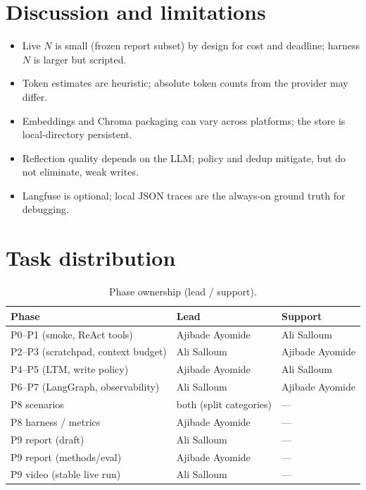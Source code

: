 \documentclass[11pt,a4paper]{article}
\begin{document}
\section{Discussion and limitations}

\begin{itemize}[leftmargin=*]
  \item Live \(N\) is small (frozen report subset) by design for cost and deadline; harness \(N\) is larger but scripted.
  \item Token estimates are heuristic; absolute token counts from the provider may differ.
  \item Embeddings and Chroma packaging can vary across platforms; the store is local-directory persistent.
  \item Reflection quality depends on the LLM; policy and dedup mitigate, but do not eliminate, weak writes.
  \item Langfuse is optional; local JSON traces are the always-on ground truth for debugging.
\end{itemize}

\section{Task distribution}

\begin{table}[ht]
\centering
\caption{Phase ownership (lead / support).}
\label{tab:owners}
\small
\begin{tabularx}{\textwidth}{@{}>{\raggedright\arraybackslash}p{} >{\raggedright\arraybackslash}X >{\raggedright\arraybackslash}X@{}}
\toprule
Phase & Lead & Support \\
\midrule
P0--P1 (smoke, ReAct tools) & Ajibade Ayomide & Ali Salloum \\
P2--P3 (scratchpad, context budget) & Ali Salloum & Ajibade Ayomide \\
P4--P5 (LTM, write policy) & Ajibade Ayomide & Ali Salloum \\
P6--P7 (LangGraph, observability) & Ali Salloum & Ajibade Ayomide \\
P8 scenarios & both (split categories) & --- \\
P8 harness / metrics & Ajibade Ayomide & --- \\
P9 report (draft) & Ali Salloum & --- \\
P9 report (methods/eval) & Ajibade Ayomide & --- \\
P9 video (stable live run) & Ali Salloum & --- \\
\bottomrule
\end{tabularx}
\end{table}
\end{document}

